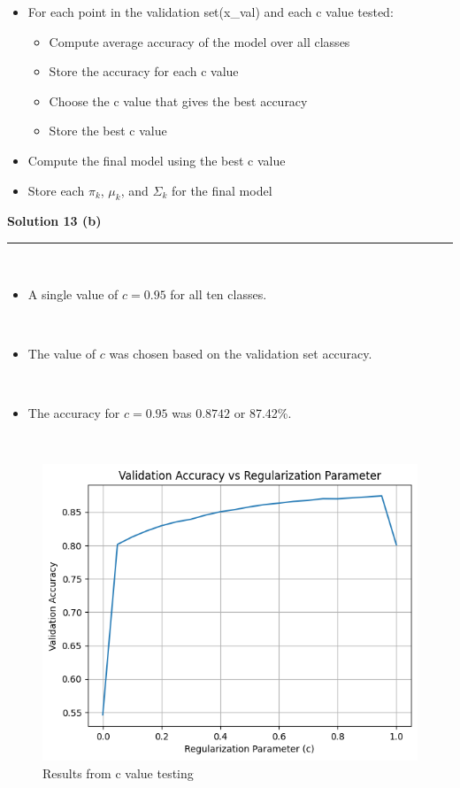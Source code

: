 \documentclass{article}
\begin{document}
\begin{enumerate}
\begin{itemize}
    \item For each point in the validation set(x\_val) and each c value tested:
    \begin{itemize}
        \item Compute average accuracy of the model over all classes
        \item Store the accuracy for each c value
        \item Choose the c value that gives the best accuracy
        \item Store the best c value
    \end{itemize}
    \item Compute the final model using the best c value
    \item Store each $\pi_k$, $\mu_k$, and $\Sigma_k$ for the final model
\end{itemize}
\end{enumerate}

\newpage
\parbox{\textwidth}{\textbf{Solution 13 (b)}}
\noindent\rule{\textwidth}{0.4pt}\\
\begin{itemize}
    \item \parbox{\textwidth}{A single value of $c=0.95$ for all ten classes.}\\
    \item \parbox{\textwidth}{The value of $c$ was chosen based on the validation set accuracy.}\\
    \item \parbox{\textwidth}{The accuracy for $c=0.95$ was $0.8742$ or 87.42\%.}\\
\end{itemize}

\begin{figure}[H]
\includegraphics[width=1\textwidth]{hw3_13b.png} 
\caption{Results from c value testing}
\end{figure}
\end{document}
